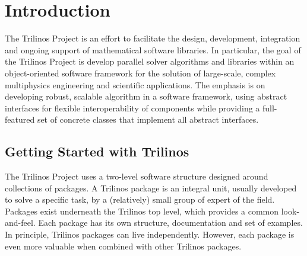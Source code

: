 % 
% 
% 
%   
%   
% 
% 

\section{Introduction}

The Trilinos Project is an effort to facilitate the design, development,
integration and ongoing support of mathematical software libraries. In
particular, the goal of the Trilinos Project is develop parallel solver
algorithms and libraries within an object-oriented software framework
for the solution of large-scale, complex multiphysics engineering and
scientific applications. The emphasis is on developing robust, scalable
algorithm in a software framework, using abstract interfaces for
flexible interoperability of components while providing a full-featured
set of concrete classes that implement all abstract interfaces.


\subsection{Getting Started with Trilinos}
\label{sec:getting}

The Trilinos Project uses a two-level software structure designed around
collections of packages. A Trilinos package is an integral unit, usually
developed to solve a specific task, by a (relatively) small group of
expert of the field.  Packages exist underneath the Trilinos top level,
which provides a common look-and-feel. Each package has its own
structure, documentation and set of examples. In principle, Trilinos
packages can live independently. However, each package is even more
valuable when combined with other Trilinos packages.

